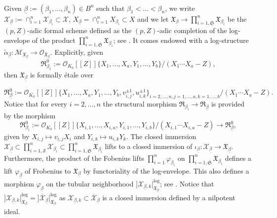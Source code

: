 \documentclass[asterisque,english]{smfart}
\begin{document}
\

Given  $\underline{\beta}:=(\beta_1,\ldots,\beta_n)\in B^n$ such that $\beta_1<\ldots < \beta_n$, we write $\mathcal{X}_{\underline{\beta}}:=\cap_{i=1}^n \mathcal{X}_{\beta_i}\subset \mathcal{X}$, $X_{\underline{\beta}}=\cap_{i=1}^n X_{\beta_i} \subset X$ and we let $\mathfrak{X}_{\underline{\beta}}\to \prod_{i=1,\mathfrak{S}}^n \mathfrak{X}_{\beta_i}$ be the $(p,Z)$-adic formal scheme defined as the $(p,Z)$-adic completion of the log-envelope of the product $ \prod_{i=1,\mathfrak{S}}^n \mathfrak{X}_{\beta_i} $; see \cite[Lemma 2.16]{AI}. It comes endowed with a log-structure $\widetilde{\alpha}_{\underline{\beta}}\colon \mathcal{M}_{\mathfrak{X}_{\underline{\beta}}}\to \mathcal{O}_{\mathfrak{X}_{\underline{\beta}}}$. Explicitly, given $$\mathfrak{R}_{\beta_1}^0:=\mathcal{O}_{K_0}[\![Z]\!]\{X_1,\ldots,X_a,Y_1,\ldots,Y_b\}/(X_1\cdots X_a-Z),$$
 then  $\mathfrak{X}_{\underline{\beta}}$ is formally \'etale over

$$\mathfrak{R}_{\underline{\beta}}^0:=\mathcal{O}_{K_0}[\![Z]\!]\{X_1,\ldots,X_a,Y_1,\ldots,Y_b, v_{i,j}^{\pm 1},u_{i,k}^{\pm 1}\}_{i=2,\ldots,n, j=1,\ldots,a, k=1,\ldots,b}/(X_1\cdots X_a-Z).$$Notice that for every $i=2,\ldots,n$ the structural morphism $\mathfrak{R}_{\beta_i}\to \mathfrak{R}_{\underline{\beta}}$ is provided by the morphism
$$\mathfrak{R}_{\beta_i}^0:=\mathcal{O}_{K_0}[\![Z]\!]\{X_{i,1},\ldots,X_{i,a},Y_{i,1},\ldots,Y_{i,b}\}/(X_{i,1}\cdots X_{i,a}-Z) \longrightarrow \mathfrak{R}_{\underline{\beta}}^0,$$ given by $X_{i,j}\mapsto v_{i,j} X_i$ and $Y_{i,k}\mapsto u_{i,k} Y_k$. The  closed immersion $\mathcal{X}_{\underline{\beta}} \subset \prod_{i=1,\mathcal{S}}^n \mathcal{X}_{\beta_i} \subset \prod_{i=1,\mathfrak{S}}^n \mathfrak{X}_{\beta_i}$ lifts to a closed immersion of $\iota_{\underline{\beta}}\colon \mathcal{X}_{\underline{\beta}} \to  \mathfrak{X}_{\underline{\beta}}$. Furthermore, the product of the Fobenius lifts $\prod_{i=1}^n \varphi_{\beta_i}$ on  $\prod_{i=1,\mathfrak{S}}^n \mathfrak{X}_{\beta_i}$ defines a lift  $\varphi_{\underline{\beta}}$ of Frobenius  to $\mathfrak{X}_{\underline{\beta}}$ by functoriality of the log-envelope. This also defines a morphism $\varphi_{\underline{\beta}}$ on the tubular neighborhood $ \big]\mathcal{X}_{\underline{\beta},k}\big[_{\mathfrak{X}_{\underline{\beta}}}^{\log}  $; see \cite[Def.~2.2.5]{Shiho}. Notice that $ \big]\mathcal{X}_{\underline{\beta},k}\big[_{\mathfrak{X}_{\underline{\beta}}}^{\log} =\big]\overline{\mathcal{X}}_{\underline{\beta}}\big[_{\mathfrak{X}_{\underline{\beta}}}^{\log}$ as $\mathcal{X}_{\underline{\beta},k}\subset \overline{\mathcal{X}}_{\underline{\beta}}$ is a closed immersion defined by a nilpotent ideal.
\end{document}
